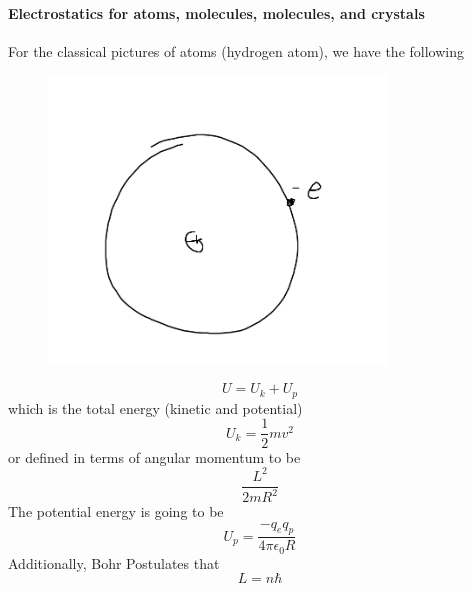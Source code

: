 \paragraph{Electrostatics for atoms, molecules, molecules, and crystals}
\begin{eg}

    For the classical pictures of atoms (hydrogen atom), we have the following 

    \begin{figure}[H]
        \centering
        \includegraphics[width=0.8\textwidth]{Figures/03.png}
        \caption{}
        \label{fig:}
    \end{figure}
    
    \[
        U = U_k + U_p
    \]
    which is the total energy (kinetic and potential)
    \[
        U_k = \frac{1}{2} m v ^{2} 
    \]
    or defined in terms of angular momentum to be 
    \[
        \frac{L^{2} }{2mR^{2} }
    \]
    The potential energy is going to be 
    \[
        U_p = \frac{-q_e q_p}{4\pi \epsilon _0 R}
    \]
    Additionally, Bohr Postulates that 
    \[
        L = n \hbar 
    \]  
\end{eg}


